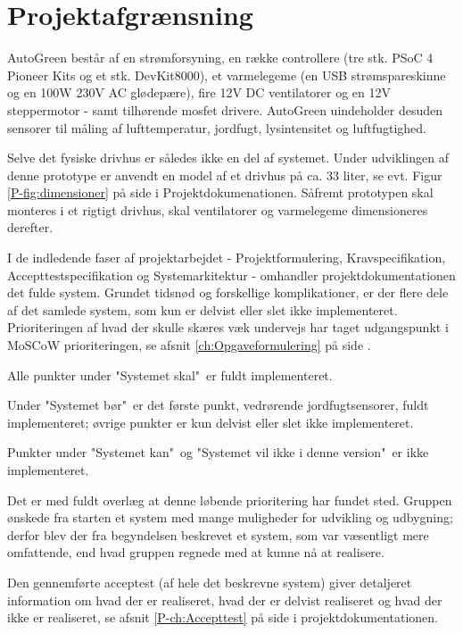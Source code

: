 \chapter{Projektafgrænsning}
\label{ch:Projektafgraensning}

AutoGreen består af en strømforsyning, en række controllere (tre stk. PSoC 4 Pioneer Kits og et stk. DevKit8000), et varmelegeme (en USB strømspareskinne og en 100W 230V AC glødepære), fire 12V DC ventilatorer og en 12V steppermotor - samt tilhørende mosfet drivere. 
AutoGreen uindeholder desuden sensorer til måling af lufttemperatur, jordfugt, lysintensitet og luftfugtighed.

Selve det fysiske drivhus er således ikke en del af systemet. 
Under udviklingen af denne prototype er anvendt en model af et drivhus på ca. 33 liter, se evt. Figur \ref{P-fig:dimensioner} på side \pageref{P-fig:dimensioner} i Projektdokumenationen. 
Såfremt prototypen skal monteres i et rigtigt drivhus, skal ventilatorer og varmelegeme dimensioneres derefter.

\mbox{}

I de indledende faser af projektarbejdet - Projektformulering, Kravspecifikation, Accepttestspecifikation og Systemarkitektur - omhandler projektdokumentationen det fulde system.
Grundet tidsnød og forskellige komplikationer, er der flere dele af det samlede system, som kun er delvist eller slet ikke implementeret.
Prioriteringen af hvad der skulle skæres væk undervejs har taget udgangspunkt i MoSCoW prioriteringen, se afsnit \ref{ch:Opgaveformulering}  på side \pageref{ch:Opgaveformulering}.

Alle punkter under "Systemet skal"\ er fuldt implementeret. 

Under "Systemet bør"\ er det første punkt, vedrørende jordfugtsensorer, fuldt implementeret; øvrige punkter er kun delvist eller slet ikke implementeret.

Punkter under "Systemet kan"\ og "Systemet vil ikke i denne version"\ er ikke implementeret. 

Det er med fuldt overlæg at denne løbende prioritering har fundet sted. 
Gruppen ønskede fra starten et system med mange muligheder for udvikling og udbygning; derfor blev der fra begyndelsen beskrevet et system, som var væsentligt mere omfattende, end hvad gruppen regnede med at kunne nå at realisere.

\mbox{}

Den gennemførte acceptest (af hele det beskrevne system) giver detaljeret information om hvad der er realiseret, hvad der er delvist realiseret og hvad der ikke er realiseret, se afsnit \ref{P-ch:Accepttest}  på side \pageref{P-ch:Accepttest} i projektdokumentationen. 


\clearpage